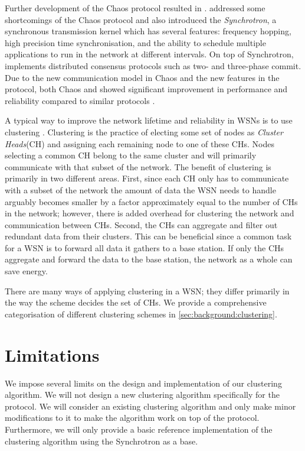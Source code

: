 Further development of the Chaos protocol resulted in \atwo{} \cite{a2-introduction-paper}. \atwo{} addressed some shortcomings of the Chaos protocol and also introduced the \atwo{} \textit{Synchrotron}, a synchronous transmission kernel which has several features: frequency hopping, high precision time synchronisation, and the ability to schedule multiple applications to run in the network at different intervals. On top of Synchrotron, \atwo{} implements distributed consensus protocols such as two- and three-phase commit. Due to the new communication model in Chaos and the new features in the \atwo{} protocol, both Chaos and \atwo{} showed significant improvement in performance and reliability compared to similar protocols \cite{chaos-introduction-paper, a2-introduction-paper}.

A typical way to improve the network lifetime and reliability in WSNs is to use clustering \cite{Afsar2014-clustering-survey, Younis2006-clustering-survey}. Clustering is the practice of electing some set of nodes as \emph{Cluster Heads}(CH) and assigning each remaining node to one of these CHs. Nodes selecting a common CH belong to the same cluster and will primarily communicate with that subset of the network. The benefit of clustering is primarily in two different areas. First, since each CH only has to communicate with a subset of the network the amount of data the WSN needs to handle arguably becomes smaller by a factor approximately equal to the number of CHs in the network; however, there is added overhead for clustering the network and communication between CHs. Second, the CHs can aggregate and filter out redundant data from their clusters. This can be beneficial since a common task for a WSN is to forward all data it gathers to a base station. If only the CHs aggregate and forward the data to the base station, the network as a whole can save energy. 

There are many ways of applying clustering in a WSN; they differ primarily in the way the scheme decides the set of CHs. We provide a comprehensive categorisation of different clustering schemes in \cref{sec:background:clustering}.


\section{Limitations}
We impose several limits on the design and implementation of our clustering algorithm. We will not design a new clustering algorithm specifically for the \atwo{} protocol. We will consider an existing clustering algorithm and only make minor modifications to it to make the algorithm work on top of the \atwo{} protocol. Furthermore, we will only provide a basic reference implementation of the clustering algorithm using the \atwo{} Synchrotron as a base.

